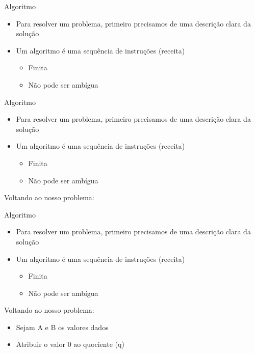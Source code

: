 \documentclass[t, aspectratio=169]{beamer}
\begin{document}
\begin{frame}[label={sec:org1c8b795}]{Algoritmo}
\begin{itemize}
\item Para resolver um problema, primeiro precisamos de uma descrição clara da solução
\item Um algoritmo é uma sequência de instruções (receita)
\begin{itemize}
\item Finita
\item Não pode ser ambígua
\end{itemize}
\end{itemize}
\end{frame}

\begin{frame}[label={sec:org12a7212}]{Algoritmo}
\begin{itemize}
\item Para resolver um problema, primeiro precisamos de uma descrição clara da solução
\item Um algoritmo é uma sequência de instruções (receita)
\begin{itemize}
\item Finita
\item Não pode ser ambígua
\end{itemize}
\end{itemize}

\alert{Voltando ao nosso problema:}
\end{frame}

\begin{frame}[label={sec:orgd3f6a7c}]{Algoritmo}
\begin{itemize}
\item Para resolver um problema, primeiro precisamos de uma descrição clara da solução
\item Um algoritmo é uma sequência de instruções (receita)
\begin{itemize}
\item Finita
\item Não pode ser ambígua
\end{itemize}
\end{itemize}

\alert{Voltando ao nosso problema:}

\begin{itemize}
\item Sejam A e B os valores dados
\item Atribuir o valor 0 ao quociente (q)
\end{itemize}
\end{frame}
\end{document}
